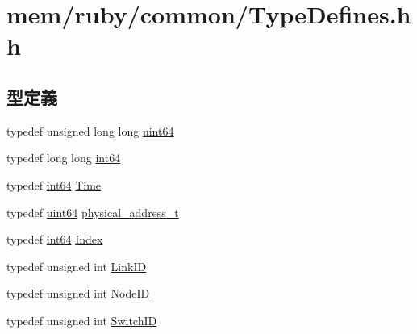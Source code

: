 \hypertarget{TypeDefines_8hh}{
\section{mem/ruby/common/TypeDefines.hh}
\label{TypeDefines_8hh}
}
\subsection*{型定義}
\begin{DoxyCompactItemize}
\item 
typedef unsigned long long \hyperlink{TypeDefines_8hh_a29940ae63ec06c9998bba873e25407ad}{uint64}
\item 
typedef long long \hyperlink{TypeDefines_8hh_aecfc3c54bd29ad5964e1c1c3ccbf89df}{int64}
\item 
typedef \hyperlink{TypeDefines_8hh_aecfc3c54bd29ad5964e1c1c3ccbf89df}{int64} \hyperlink{TypeDefines_8hh_ade1c8a9958f9e5394c2e78269e654872}{Time}
\item 
typedef \hyperlink{TypeDefines_8hh_a29940ae63ec06c9998bba873e25407ad}{uint64} \hyperlink{TypeDefines_8hh_a7901e1a365850c5ff38ec6e12b6b9ffc}{physical\_\-address\_\-t}
\item 
typedef \hyperlink{TypeDefines_8hh_aecfc3c54bd29ad5964e1c1c3ccbf89df}{int64} \hyperlink{TypeDefines_8hh_a39642de41f3574937f399f4fab25ba18}{Index}
\item 
typedef unsigned int \hyperlink{TypeDefines_8hh_ab5106a4c9f29d7d11860745608da944d}{LinkID}
\item 
typedef unsigned int \hyperlink{TypeDefines_8hh_a83c14b4ae37e80071f6b3506a6c46151}{NodeID}
\item 
typedef unsigned int \hyperlink{TypeDefines_8hh_ac925a332c83eaf1e40e056e7a20ebcd8}{SwitchID}
\end{DoxyCompactItemize}


